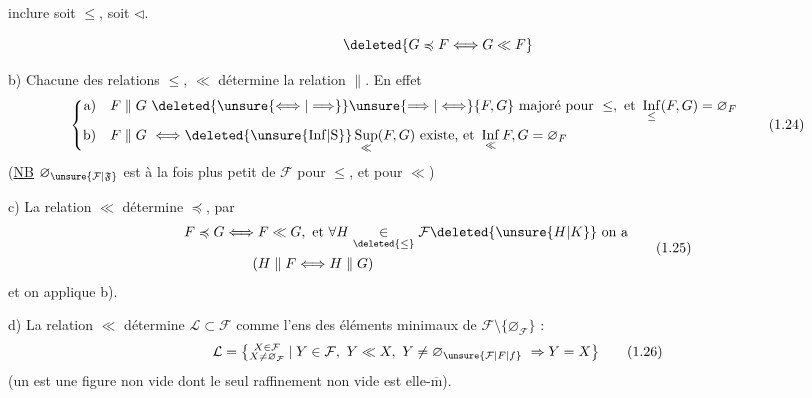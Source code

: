 inclure soit $\leq$, soit $\triangleleft$.

\[
\deleted{G\preccurlyeq F\Longleftrightarrow G\ll F}
\]

b) Chacune des relations $\leq$, $\ll$ détermine la relation $\parallel$. En effet
\[
\left\{\begin{aligned}
\text{a)}\quad F\parallel G &\ \deleted{\unsure{\Longleftrightarrow|\Longrightarrow}}\unsure{\Longrightarrow|\Longleftrightarrow}
 \{F,G\}\ \text{majoré pour }\leq,\ \text{et }\mathop{\mathrm{Inf}}\limits_{\leq}(F,G)=\varnothing_F\\
\text{b)}\quad F\parallel G &\ \Longleftrightarrow
 \deleted{\unsure{\mathrm{Inf}|\mathrm{S}}}\mathop{\mathrm{Sup}}\limits_{\ll}(F,G)\ \text{existe, et }\mathop{\mathrm{Inf}}\limits_{\ll} F,G=\varnothing_F
\end{aligned}\right.
\tag*{(1.24)}
\]
(\uline{NB} $\varnothing_{\unsure{\mathcal{F}|\mathfrak{F}}}$ est à la fois plus petit  de $\mathcal{F}$ pour $\leq$, et pour $\ll$)

c) La relation $\ll$ détermine $\preccurlyeq$, par
\margin{$\times$}
\[
\begin{aligned}
F\preccurlyeq G &\Longleftrightarrow F\ll G,\ \text{et }\forall H\underset{\deleted{\leq}}{\in}\mathcal{F}\deleted{\unsure{H|K}}\ \text{on a}\\
&\hspace{2em}(H\parallel F\Longleftrightarrow H\parallel G)
\end{aligned}
\tag*{(1.25)}
\]
et on applique b).

d) La relation $\ll$ détermine $\mathcal{L}\subset\mathcal{F}$ comme l'ens des éléments minimaux de $\mathcal{F}\setminus\{\varnothing_{\mathcal{F}}\}$ :
\[
\mathcal{L}=\bigl\{\substack{X\in\mathcal{F}\\ X\neq\varnothing_{\mathcal{F}}}\mid
 Y\in\mathcal{F},\ Y\ll X,\ Y\neq\varnothing_{\unsure{\mathcal{F}|F|f}}\ \Rightarrow Y=X\bigr\} \tag*{(1.26)}
\]
(un  est une figure non vide dont le seul raffinement non vide est elle-$\overline{\mathrm m}$).

